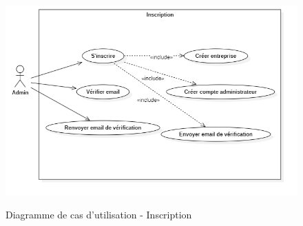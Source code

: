 \begin{figure}[H]
    \centering
    \includegraphics[width=12cm,height=8cm]{images/inscriptionuc.png}
    \caption{Diagramme de cas d'utilisation - Inscription}
\end{figure}

